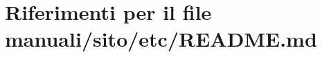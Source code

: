 \hypertarget{manuali_2sito_2etc_2README_8md}{}\section{Riferimenti per il file manuali/sito/etc/\+R\+E\+A\+D\+ME.md}
\label{manuali_2sito_2etc_2README_8md}
